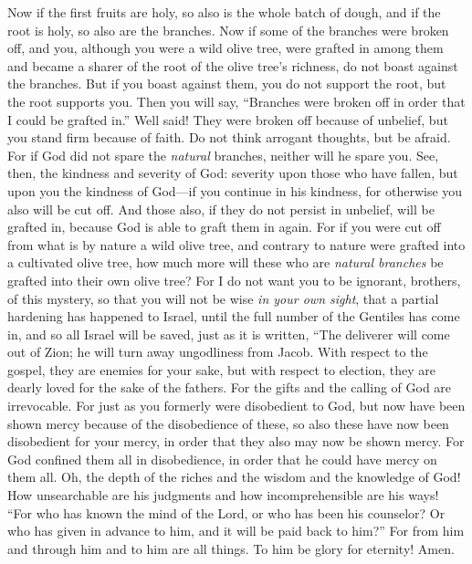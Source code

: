 \begin{biblechapter}
\verse Now if the first fruits are holy, so also is the whole batch of dough, and if the root is holy, so also are the branches.
\verse Now if some of the branches were broken off, and you, although you were a wild olive tree, were grafted in among them and became a sharer of the root of the olive tree’s richness,
\verse do not boast against the branches. But if you boast against them, you do not support the root, but the root supports you.
\verse Then you will say, “Branches were broken off in order that I could be grafted in.”
\verse Well said! They were broken off because of unbelief, but you stand firm because of faith. Do not think arrogant thoughts, but be afraid.
\verse For if God did not spare the \textit{natural} branches, neither will he spare you.
\verse See, then, the kindness and severity of God: severity upon those who have fallen, but upon you the kindness of God—if you continue in his kindness, for otherwise you also will be cut off.
\verse And those also, if they do not persist in unbelief, will be grafted in, because God is able to graft them in again.
\verse For if you were cut off from what is by nature a wild olive tree, and contrary to nature were grafted into a cultivated olive tree, how much more will these who are \textit{natural branches} be grafted into their own olive tree?
 For I do not want you to be ignorant, brothers, of this mystery, so that you will not be wise \textit{in your own sight}, that a partial hardening has happened to Israel, until the full number of the Gentiles has come in,
\verse and so all Israel will be saved, just as it is written,
\verse “The deliverer will come out of Zion; 
he will turn away ungodliness from Jacob.
\verse With respect to the gospel, they are enemies for your sake, but with respect to election, they are dearly loved for the sake of the fathers.
\verse For the gifts and the calling of God are irrevocable.
\verse For just as you formerly were disobedient to God, but now have been shown mercy because of the disobedience of these,
\verse so also these have now been disobedient for your mercy, in order that they also may now be shown mercy.
\verse For God confined them all in disobedience, in order that he could have mercy on them all.
\verse Oh, the depth of the riches 
and the wisdom and the knowledge of God! 
How unsearchable are his judgments 
and how incomprehensible are his ways!
\verse “For who has known the mind of the Lord, 
or who has been his counselor?
\verse Or who has given in advance to him, 
and it will be paid back to him?”
\verse For from him and through him and to him are all things. 
To him be glory for eternity! Amen.
\end{biblechapter}

